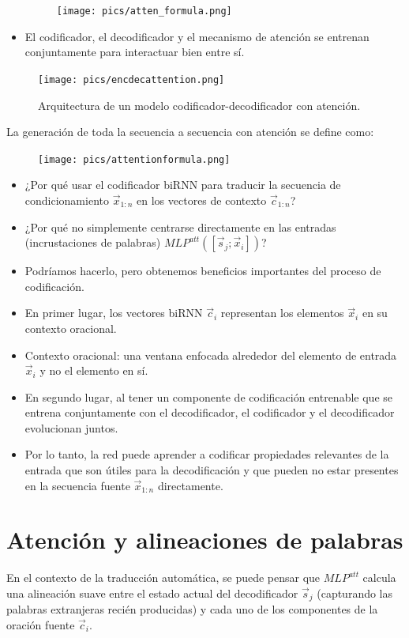 \documentclass{book}
\begin{document}
\begin{itemize}
\begin{figure}[h]
  \centering
  \texttt{[image: pics/atten\_formula.png]}
\end{figure}

\item El codificador, el decodificador y el mecanismo de atención se entrenan conjuntamente para interactuar bien entre sí.
\end{itemize}

\begin{figure}[h]
  \centering
  \texttt{[image: pics/encdecattention.png]}
  \caption{Arquitectura de un modelo codificador-decodificador con atención.}
\end{figure}

La generación de toda la secuencia a secuencia con atención se define como:

\begin{figure}[h]
  \centering
  \texttt{[image: pics/attentionformula.png]}
\end{figure}

\begin{itemize}
\item ¿Por qué usar el codificador biRNN para traducir la secuencia de condicionamiento $\vec{x}_{1:n}$ en los vectores de contexto $\vec{c}_{1:n}$?
\item ¿Por qué no simplemente centrarse directamente en las entradas (incrustaciones de palabras) $MLP^{att}([\vec{s}_j;\vec{x}_i])$?
\item Podríamos hacerlo, pero obtenemos beneficios importantes del proceso de codificación.
\item En primer lugar, los vectores biRNN $\vec{c}_i$ representan los elementos $\vec{x}_i$ en su contexto oracional.
\item Contexto oracional: una ventana enfocada alrededor del elemento de entrada $\vec{x}_i$ y no el elemento en sí.
\item En segundo lugar, al tener un componente de codificación entrenable que se entrena conjuntamente con el decodificador, el codificador y el decodificador evolucionan juntos.
\item Por lo tanto, la red puede aprender a codificar propiedades relevantes de la entrada que son útiles para la decodificación y que pueden no estar presentes en la secuencia fuente $\vec{x}_{1:n}$ directamente.
\end{itemize}



\section{Atención y alineaciones de palabras}
En el contexto de la traducción automática, se puede pensar que $MLP^{att}$ calcula una alineación suave entre el estado actual del decodificador $\vec{s}_j$ (capturando las palabras extranjeras recién producidas) y cada uno de los componentes de la oración fuente $\vec{c}_i$.
\end{document}
